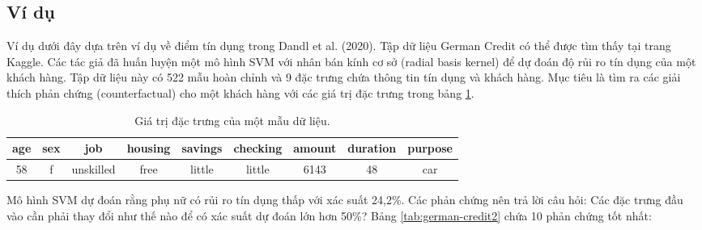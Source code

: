 \subsection{Ví dụ}

Ví dụ dưới đây dựa trên ví dụ về điểm tín dụng trong Dandl et al. (2020). Tập dữ liệu German Credit có thể được tìm thấy tại trang Kaggle. Các tác giả đã huấn luyện một mô hình SVM với nhân bán kính cơ sở (radial basis kernel) để dự đoán độ rủi ro tín dụng của một khách hàng. Tập dữ liệu này có 522 mẫu hoàn chỉnh và 9 đặc trưng chứa thông tin tín dụng và khách hàng. Mục tiêu là tìm ra các giải thích phản chứng (counterfactual) cho một khách hàng với các giá trị đặc trưng trong bảng \ref{tab:german-credit}.

\begin{table}[hbt!]
\caption{Giá trị đặc trưng của một mẫu dữ liệu.}
\centering
\label{tab:german-credit}
\begin{tabular}{|c|c|c|c|c|c|c|c|c|}
\hline
age & sex & job       & housing & savings & checking & amount & duration & purpose \\ \hline
58  & f   & unskilled & free    & little  & little   & 6143   & 48       & car     \\ \hline
\end{tabular}
\end{table}

Mô hình SVM dự đoán rằng phụ nữ có rủi ro tín dụng thấp với xác suất 24,2\%. Các phản chứng nên trả lời câu hỏi: Các đặc trưng đầu vào cần phải thay đổi như thế nào để có xác suất dự đoán lớn hơn 50\%? Bảng \ref{tab:german-credit2} chứa 10 phản chứng tốt nhất:

